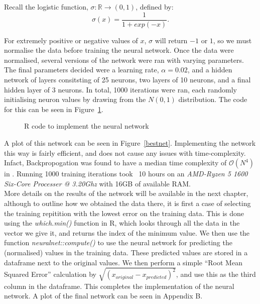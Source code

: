 Recall the logistic function, $\sigma : \mathbb{R} \to (0,1)$, defined by:
\[
    \sigma(x) = \frac{1}{1+exp(-x)}.
\]

For extremely positive or negative values of $x$, $\sigma$ will return $-1$ or $1$, so we must normalise the data before training the neural 
network. Once the data were normalised, several versions of the network were ran with varying parameters. The final parameters decided were a learning rate, $\alpha = 0.02$, and a hidden network of layers consitsting of 
25 neurons, two layers of 10 neurons, and a final hidden layer of 3 neurons. In total, 1000 iterations were ran, each randomly initialising neuron values by drawing from the $N(0,1)$ distribution. 
The code for this can be seen in Figure~\ref{nnRcode}.

\begin{figure}[h] %
    
    \caption{R code to implement the neural network}
    \label{nnRcode}
\end{figure}

A plot of this network can be seen in Figure~\ref{bestnet}. Implementing the network this way is fairly efficient, and does not cause any issues with time-complexity. Infact, Backpropogation 
was found to have a median time complexity of $\mathcal{O}(N^4)$ in \cite{lister}. Running 1000 training iterations took ~10 hours on an \textit{AMD-Ryzen 5 1600 Six-Core Processer @ 3.20Ghz} with 16GB of available RAM. \\

More details on the results of the network will be available in the next chapter, although to outline how we obtained the data there, it is first a case of selecting the training repitition 
with the lowest error on the training data. This is done using the \textit{which.min()} function in R, which looks through all the data in the vector we give it, and returns the index of the minimum value.
We then use the function \textit{neuralnet::compute()} to use the neural network for predicting the (normalised) values in the training data. These predicted values are stored in a dataframe next to the original values. 
We then perform a simple ``Root Mean Squared Error'' calculation by $\sqrt{(x_{original}-x_{predicted})^2}$, and use this as the third column in the dataframe. This completes the implementation of the neural network.
A plot of the final network can be seen in Appendix B. 
